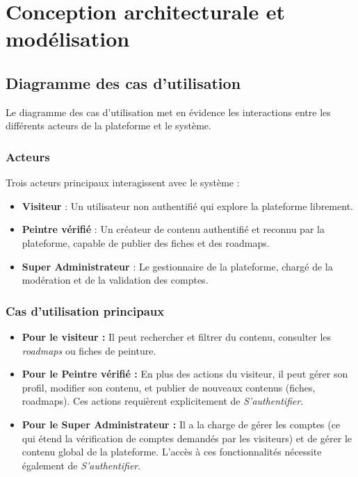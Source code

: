 \documentclass[12pt,a4paper]{report}
\begin{document}
\newpage

\section{Conception architecturale et modélisation}

\subsection{Diagramme des cas d'utilisation}

Le diagramme des cas d'utilisation met en évidence les interactions entre les différents acteurs de la plateforme et le système.

\subsubsection*{Acteurs}

Trois acteurs principaux interagissent avec le système :
\begin{itemize}
    \item \textbf{Visiteur} : Un utilisateur non authentifié qui explore la plateforme librement.
    \item \textbf{Peintre vérifié} : Un créateur de contenu authentifié et reconnu par la plateforme, capable de publier des fiches et des roadmaps.
    \item \textbf{Super Administrateur} : Le gestionnaire de la plateforme, chargé de la modération et de la validation des comptes.
\end{itemize}

\subsubsection*{Cas d'utilisation principaux}

\begin{itemize}
    \item \textbf{Pour le visiteur :} Il peut rechercher et filtrer du contenu, consulter les \textit{roadmaps} ou fiches de peinture.
    \item \textbf{Pour le Peintre vérifié :} En plus des actions du visiteur, il peut gérer son profil, modifier son contenu, et publier de nouveaux contenus (fiches, roadmaps). Ces actions requièrent explicitement de \textit{S'authentifier}.
    \item \textbf{Pour le Super Administrateur :} Il a la charge de gérer les comptes (ce qui étend la vérification de comptes demandés par les visiteurs) et de gérer le contenu global de la plateforme. L'accès à ces fonctionnalités nécessite également de \textit{S'authentifier}.
\end{itemize}
\end{document}
